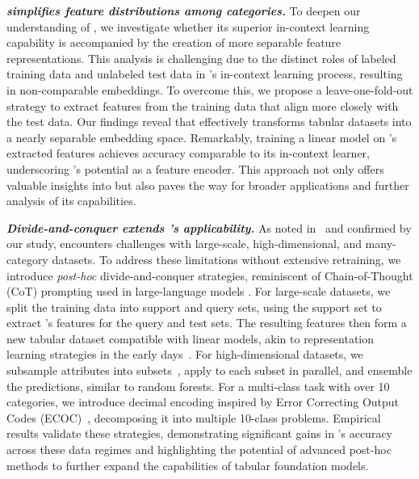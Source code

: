 \noindent\textbf{\emph{\ours simplifies feature distributions among categories.}} To deepen our understanding of \ours, we investigate whether its superior in-context learning capability is accompanied by the creation of more separable feature representations. This analysis is challenging due to the distinct roles of labeled training data and unlabeled test data in \ours's in-context learning process, resulting in non-comparable embeddings. To overcome this, we propose a leave-one-fold-out strategy to extract features from the training data that align more closely with the test data. Our findings reveal that \ours effectively transforms tabular datasets into a nearly separable embedding space. Remarkably, training a linear model on \ours's extracted features achieves accuracy comparable to its in-context learner, underscoring \ours's potential as a feature encoder. This approach not only offers valuable insights into \ours but also paves the way for broader applications and further analysis of its capabilities.

\noindent\textbf{\emph{Divide-and-conquer extends \ours's applicability.}} As noted in~\citet{hollmann2025TabPFNv2} and confirmed by our study, \ours encounters challenges with large-scale, high-dimensional, and many-category datasets. To address these limitations without extensive retraining, we introduce \emph{post-hoc} divide-and-conquer strategies, reminiscent of Chain-of-Thought (CoT) prompting used in large-language models \cite{Wei2022CoT}. For large-scale datasets, we split the training data into support and query sets, using the support set to extract \ours's features for the query and test sets. The resulting features then form a new tabular dataset compatible with linear models, akin to representation learning strategies in the early days~\cite{VincentLLBM10Stacked-auto-encoder}. For high-dimensional datasets, we subsample attributes into subsets~\cite{Breiman01RandomForest}, apply \ours to each subset in parallel, and ensemble the predictions, similar to random forests. For a multi-class task with over 10 categories, we introduce decimal encoding inspired by Error Correcting Output Codes (ECOC)~\cite{Dietterich1995ECOC}, decomposing it into multiple 10-class problems. 
Empirical results validate these strategies, demonstrating significant gains in \ours's accuracy across these data regimes and highlighting the potential of advanced post-hoc methods to further expand the capabilities of tabular foundation models.

